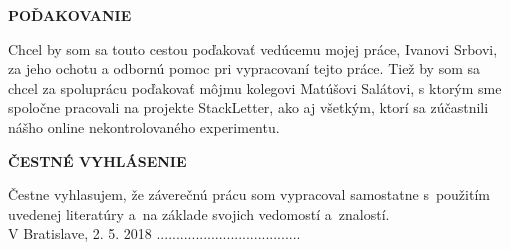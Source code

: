 
\newpage
\thispagestyle{plain}
\vspace*{19cm}
\begin{large}
\noindent
\textbf{POĎAKOVANIE} \\
\end{large}
\noindent
Chcel by som sa touto cestou poďakovať vedúcemu mojej práce, Ivanovi Srbovi, za jeho ochotu a odbornú pomoc pri vypracovaní tejto práce.
Tiež by som sa chcel za spoluprácu poďakovať môjmu kolegovi Matúšovi Salátovi, s ktorým sme spoločne pracovali na projekte StackLetter,
ako aj všetkým, ktorí sa zúčastnili nášho online nekontrolovaného experimentu.
\afterpage{\blankpage}


\newpage
\thispagestyle{plain}
\vspace*{19cm}
\begin{large}
\noindent
\textbf{ČESTNÉ VYHLÁSENIE} \\
\end{large}
\noindent
Čestne vyhlasujem, že záverečnú prácu som vypracoval samostatne s~použitím uvedenej literatúry a~na základe svojich
vedomostí a~znalostí.
\vspace*{1.5cm}\\
V Bratislave, 2. 5. 2018 \hspace*{6.9cm}.....................................\\
\hspace*{11.5cm} \Author
\afterpage{\blankpage}
